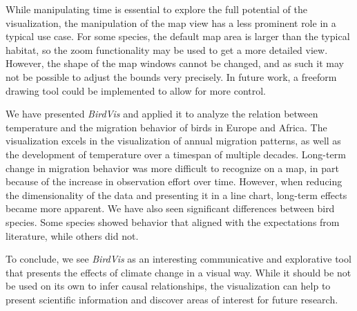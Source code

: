\documentclass[journal]{vgtc}                %
\begin{document}
While manipulating time is essential to explore the full potential of the visualization, the manipulation of the map view has a less prominent role in a typical use case. For some species, the default map area is larger than the typical habitat, so the zoom functionality may be used to get a more detailed view. However, the shape of the map windows cannot be changed, and as such it may not be possible to adjust the bounds very precisely. In future work, a freeform drawing tool could be implemented to allow for more control.

We have presented \emph{BirdVis} and applied it to analyze the relation between temperature and the migration behavior of birds in Europe and Africa. The visualization excels in the visualization of annual migration patterns, as well as the development of temperature over a timespan of multiple decades. Long-term change in migration behavior was more difficult to recognize on a map, in part because of the increase in observation effort over time. However, when reducing the dimensionality of the data and presenting it in a line chart, long-term effects became more apparent. We have also seen significant differences between bird species. Some species showed behavior that aligned with the expectations from literature, while others did not.

To conclude, we see \emph{BirdVis} as an interesting communicative and explorative tool that presents the effects of climate change in a visual way. While it should be not be used on its own to infer causal relationships, the visualization can help to present scientific information and discover areas of interest for future research.



\end{document}
